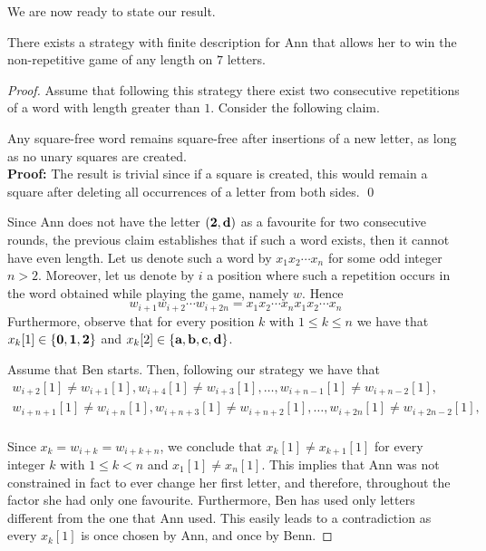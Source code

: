 \documentclass[runningheads,fleqn]{llncs}
\begin{document}
We are now ready to state our result.
\begin{theorem}
There exists a strategy with finite description for Ann that allows her to win the non-repetitive game of any length on $7$ letters.
\end{theorem}
\begin{proof}
Assume that following this strategy there exist two consecutive repetitions of a word with length greater than $1$. Consider the following claim.

\medskip{}\qquad
Any square-free word remains square-free after insertions of a new letter, as long as no unary squares are created.\\
{\bf Proof:}\qquad
The result is trivial since if a square is created, this would remain a square after deleting all occurrences of a letter from both sides.
\hfill\qed\medskip

Since Ann does not have the letter $(\textbf 2,\textbf d)$ as a favourite for two consecutive rounds, the previous claim establishes that if such a word exists, then it cannot have even length. Let us denote such a word by $x_1x_2\cdots x_n$ for some odd integer $n>2$. Moreover, let us denote by $i$ a position where such a repetition occurs in the word obtained while playing the game, namely $w$. Hence
$$w_{i+1}w_{i+2}\cdots w_{i+2n}=x_{1}x_{2}\cdots x_{n}x_{1}x_{2}\cdots x_{n}$$
Furthermore, observe that for every position $k$ with $1\leq k \leq n$ we have that $x_k[1]\in\{\textbf 0,\textbf 1,\textbf 2\}$ and $x_k[2]\in\{\textbf a,\textbf b,\textbf c,\textbf d\}$.
 
Assume that Ben starts. Then, following our strategy we have that 
\begin{equation*}
\begin{split}
w_{i+2}[1]\neq w_{i+1}[1], w_{i+4}[1]\neq w_{i+3}[1], \ldots,  w_{i+n-1}[1]\neq w_{i+n-2}[1],\\
w_{i+n+1}[1]\neq w_{i+n}[1], w_{i+n+3}[1]\neq w_{i+n+2}[1], \ldots,  w_{i+2n}[1]\neq w_{i+2n-2}[1],\\
\end{split}
\end{equation*}


Since $x_k=w_{i+k}=w_{i+k+n}$, we conclude that $x_k[1] \neq x_{k+1}[1]$ for every integer $k$ with $1\leq k < n$ and $x_1[1]\neq x_n[1]$. This implies that Ann was not constrained in fact to ever change her first letter, and therefore, throughout the factor she had only one favourite. Furthermore, Ben has used only letters different from the one that Ann used. This easily leads to a contradiction as every $x_k[1]$ is once chosen by Ann, and once by Benn.


\end{proof}
\end{document}
